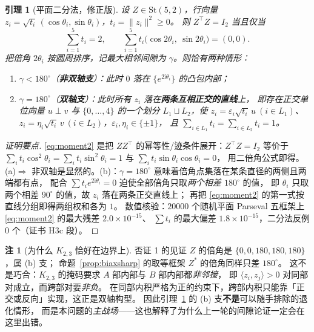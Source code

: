 \documentclass[UTF8,11pt]{ctexart}
\newtheorem{lemma}[theorem]{引理}
\theoremstyle{definition}
\newtheorem{remark}[theorem]{注}
\begin{document}
\begin{lemma}[平面二分法，修正版]\label{lem:planar}
设 $Z\in\mathrm{St}(5,2)$，行向量 $z_i=\sqrt{t_i}\,(\cos\theta_i,\sin\theta_i)$，$t_i=\|z_i\|^2\ge0$。
则 $Z^\top Z=I_2$ 当且仅当
\begin{equation}\label{eq:moment2}
\sum_{i=1}^5 t_i=2,\qquad \sum_{i=1}^5 t_i\bigl(\cos2\theta_i,\ \sin2\theta_i\bigr)=(0,0).
\end{equation}
把倍角 $2\theta_i$ 按圆周排序，记最大相邻间隙为 $\gamma$。则恰有两种情形：
\begin{enumerate}[label=(\alph*),leftmargin=2em]
\item $\gamma<180^\circ$（\textbf{非双轴支}）：此时 $0$ 落在 $\{e^{2\mathrm i\theta_i}\}$ 的凸包\emph{内部}；
\item $\gamma=180^\circ$（\textbf{双轴支}）：此时所有 $z_i$ 落在\textbf{两条互相正交的直线}上，
即存在正交单位向量 $u\perp v$ 与 $\{0,\dots,4\}$ 的一个划分 $L_1\sqcup L_2$，使
$z_i=\varepsilon_i\sqrt{t_i}\,u\ (i\in L_1)$、$z_i=\eta_i\sqrt{t_i}\,v\ (i\in L_2)$，$\varepsilon_i,\eta_i\in\{\pm1\}$，
且 $\sum_{i\in L_1}t_i=\sum_{i\in L_2}t_i=1$。
\end{enumerate}
\end{lemma}

\begin{proof}[证明要点]
\eqref{eq:moment2} 是把 $ZZ^\top$ 的幂等性/迹条件展开：$Z^\top Z=I_2$ 等价于
$\sum_i t_i\cos^2\theta_i=\sum_i t_i\sin^2\theta_i=1$ 与 $\sum_i t_i\sin\theta_i\cos\theta_i=0$，
用二倍角公式即得。
(a)$\Rightarrow$ 非双轴是显然的。(b)：$\gamma=180^\circ$ 意味着倍角点集落在某条直径的两侧且两端都有点，
配合 $\sum t_ie^{2\mathrm i\theta_i}=0$ 迫使全部倍角只取\emph{两个相差 $180^\circ$} 的值，
即 $\theta_i$ 只取两个相差 $90^\circ$ 的值，故 $z_i$ 落在两条正交直线上；
再把 \eqref{eq:moment2} 的第一式按直线分组即得两组权和各为 $1$。
数值核验：$20000$ 个随机平面 Parseval 五框架上 \eqref{eq:moment2} 的最大残差 $2.0\times10^{-15}$、
$\sum t_i$ 的最大偏差 $1.8\times10^{-15}$，二分法反例 $0$ 个（证书 H3c 段）。
\end{proof}

\begin{remark}[为什么 $K_{2,3}$ 恰好在边界上]\label{rmk:boundary}
否证 1 的见证 $Z$ 的倍角是 $\{0,0,180,180,180\}$，属 (b) 支；
命题~\ref{prop:biaxsharp} 的取等框架 $Z^\ast$ 的倍角同样只差 $180^\circ$。
这不是巧合：$K_{2,3}$ 的掩码要求 $A$ 部内部与 $B$ 部内部都\emph{非邻接}，
即 $\langle z_i,z_j\rangle>0$ 对同部对成立，而跨部对要\emph{非负}。
在同部内积严格为正的约束下，跨部内积只能靠「正交或反向」实现，这正是双轴构型。
因此引理~\ref{lem:planar} 的 (b) 支\textbf{不是}可以随手排除的退化情形，
而是本问题的\emph{主战场}——这也解释了为什么上一轮的间隙论证一定会在这里出错。
\end{remark}
\end{document}
